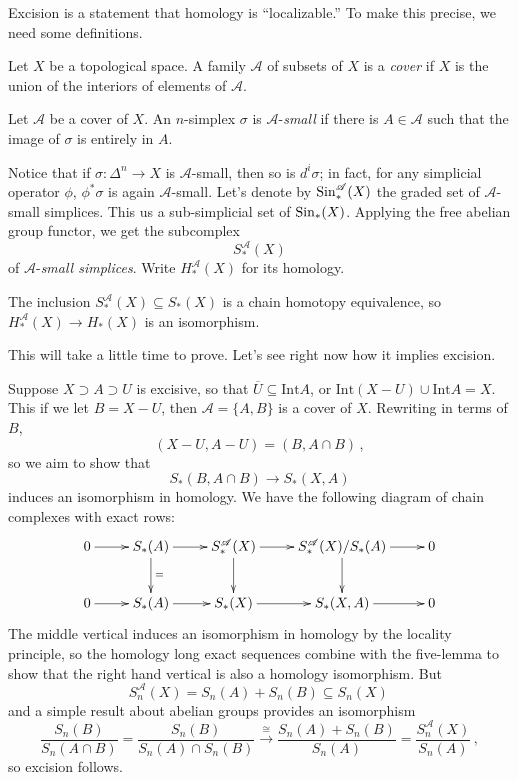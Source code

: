 \bigskip
Excision is a statement that homology is ``localizable.'' To make this precise, we need some definitions. 

\begin{definition}
Let $X$ be a topological space. A family $\mathscr{A}$ of subsets of $X$ is a
{\em cover} if $X$ is the union of the interiors of elements of $\mathscr{A}$. 
\end{definition}
\begin{definition}
Let ${\mathscr{A}}$ be a cover of $X$. An $n$-simplex $\sigma$ is ${\mathscr{A}}$-{\em small} if there is $A\in \mathscr{A}$ such that the image of $\sigma$ is entirely in $A$.
\end{definition}
Notice that if $\sigma:\Delta^n\to X$ is ${\mathscr{A}}$-small, then so is $d^i\sigma$; in fact, for any simplicial operator $\phi$, $\phi^*\sigma$ is again $\mathscr{A}$-small. Let's denote by $\mathrm{Sin}^{\mathscr{A}}_*(X)$ the graded set of ${\mathscr{A}}$-small simplices. This us a sub-simplicial set of $\mathrm{Sin}_*(X)$.
Applying the free abelian group functor, we get the subcomplex 
\[
S^{\mathscr{A}}_\ast(X)
\]
of $\mathscr{A}$-{\em small simplices}. Write $H^{\mathscr{A}}_*(X)$ for its
homology.
\begin{theorem}
The inclusion $S^\mathscr{A}_\ast(X)\subseteq S_\ast(X)$ is a chain homotopy equivalence, so $H^\mathscr{A}_\ast(X)\to H_\ast(X)$ is an isomorphism.
\end{theorem}
This will take a little time to prove. Let's see right now how it implies excision.

Suppose $X\supset A\supset U$ is excisive, so that 
$\overline U\subseteq\mathrm{Int}A$, or $\mathrm{Int}(X-U)\cup\mathrm{Int}A=X$.
This if we let $B=X-U$, then $\mathscr{A}=\{A,B\}$ is a cover of $X$. 
Rewriting in terms of $B$,
\[
(X-U,A-U)=(B,A\cap B)\,,
\]
so we aim to show that 
\[
S_*(B,A\cap B)\rightarrow S_*(X,A)
\]
induces an isomorphism in homology. We have the following diagram of chain complexes with exact rows:
\[
\xymatrix{
0 \ar[r] & S_*(A) \ar[d]^= \ar[r] & S^{\mathscr{A}}_*(X) \ar[d]\ar[r] &
S^{\mathscr{A}}_*(X)/S_*(A) \ar[d]\ar[r] & 0 \\
0 \ar[r] & S_*(A) \ar[r] & S_*(X) \ar[r] & S_*(X,A) \ar[r] & 0 
}\]
The middle vertical induces an isomorphism in homology by the locality principle, so the homology long exact sequences combine with the five-lemma to show that the right hand vertical is also a homology isomorphism. But 
\[
S^{\mathscr{A}}_n(X)=S_n(A)+S_n(B)\subseteq S_n(X)\,
\]
and a simple result about abelian groups provides an isomorphism
\[
\frac{S_n(B)}{S_n(A\cap B)}=
\frac{S_n(B)}{S_n(A)\cap S_n(B)}\xrightarrow{\cong}
\frac{S_n(A)+S_n(B)}{S_n(A)}
=\frac{S_n^{\mathscr{A}}(X)}{S_n(A)}\,,
\]
so excision follows.

